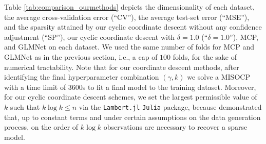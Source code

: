 \documentclass[opre,nonblindrev]{informs3} %
\begin{document}
Table \ref{tab:comparison_ourmethods} depicts the dimensionality of each dataset, the average cross-validation error (``CV''), the average test-set error (``MSE''), and the sparsity attained by our cyclic coordinate descent without any confidence adjustment (``SP''), our cyclic coordinate descent with $\delta=1.0$ (``$\delta=1.0$''), MCP, and GLMNet on each dataset. We used the same number of folds for MCP and GLMNet as in the previous section, i.e., a cap of $100$ folds, for the sake of numerical tractability. Note that for our coordinate descent methods, after identifying the final hyperparameter combination $(\gamma, k)$ we solve a MISOCP with a time limit of $3600$s to fit a final model to the training dataset. Moreover, for our cyclic coordinate descent schemes, we set the largest permissible value of $k$ such that $k \log k \leq n$ via the \verb|Lambert.jl| \verb|Julia| package, because \citet[Theorem 2.5]{gamarnik2022sparse} demonstrated that, up to constant terms and under certain assumptions on the data generation process, on the order of $k \log k$ observations are necessary to recover a sparse model.
\end{document}
